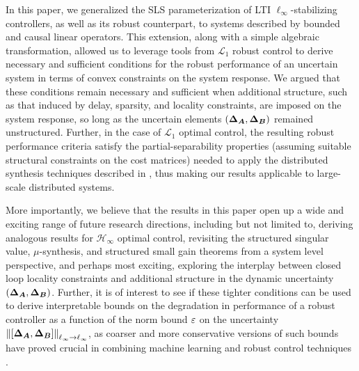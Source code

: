 In this paper, we generalized the SLS parameterization of LTI $\ell_\infty$-stabilizing controllers, as well as its robust counterpart, to systems described by bounded and causal linear operators.  This extension, along with a simple algebraic transformation, allowed us to leverage tools from $\mathcal{L}_1$ robust control to derive necessary and sufficient conditions for the robust performance of an uncertain system in terms of convex constraints on the system response.  We argued that these conditions remain necessary and sufficient when additional structure, such as that induced by delay, sparsity, and locality constraints, are imposed on the system response, so long as the uncertain elements $({\boldsymbol{\Delta}}_{\boldsymbol{A}},{\boldsymbol{\Delta}}_{\boldsymbol{B}})$ remained unstructured.  Further, in the case of $\mathcal{L}_1$ optimal control, the resulting robust performance criteria satisfy the partial-separability properties (assuming suitable structural constraints on the cost matrices) needed to apply the distributed synthesis techniques described in \cite{wang2018separable}, thus making our results applicable to large-scale distributed systems. 

More importantly, we believe that the results in this paper open up a wide and exciting range of future research directions, including but not limited to, deriving analogous results for $\mathcal{H}_\infty$ optimal control, revisiting the structured singular value, $\mu$-synthesis, and structured small gain theorems from a system level perspective, and perhaps most exciting, exploring the interplay between closed loop locality constraints and additional structure in the dynamic uncertainty $({\boldsymbol{\Delta}}_{\boldsymbol{A}},{\boldsymbol{\Delta}}_{\boldsymbol{B}})$.  Further, it is of interest to see if these tighter conditions can be used to derive interpretable bounds on the degradation in performance of a robust controller as a function of the norm bound $\varepsilon$ on the uncertainty $\left\|[{\boldsymbol{\Delta}}_{\boldsymbol{A}},{\boldsymbol{\Delta}}_{\boldsymbol{B}}]\right\|_{\ell_\infty\to\ell_\infty}$, as coarser and more conservative versions of such bounds have proved crucial in combining machine learning and robust control techniques \cite{dean2017sample,dean2018regret,dean2019safely}.